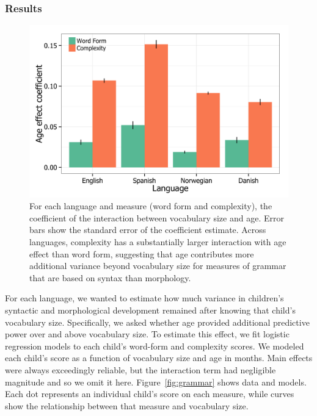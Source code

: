 \documentclass[10pt,letterpaper]{article}
\begin{document}

\subsubsection{Results}

\begin{figure}
\begin{center}
\includegraphics[width=\linewidth]{plots/coefs_wordform_complexity.png}
\end{center}
\caption{\label{fig:coefs_grammar}  For each language and measure (word form and complexity), the coefficient of the interaction between vocabulary size and age. Error bars show the standard error of the coefficient estimate. Across languages, complexity has a substantially larger interaction with age effect than word form, suggesting that age contributes more additional variance beyond vocabulary size for measures of grammar that are based on syntax than morphology.} 
\end{figure}

For each language, we wanted to estimate how much variance in children's syntactic and morphological development remained after knowing that child's vocabulary size. Specifically, we asked whether age provided additional predictive power over and above vocabulary size. To estimate this effect, we fit logistic regression models to each child's word-form and complexity scores. We modeled each child's score as a function of vocabulary size and age in months. Main effects were always exceedingly reliable, but the interaction term had negligible magnitude and so we omit it here. Figure~\ref{fig:grammar} shows data and models. Each dot represents an individual child's score on each measure, while curves show the relationship between that measure and vocabulary size. 
\end{document}
